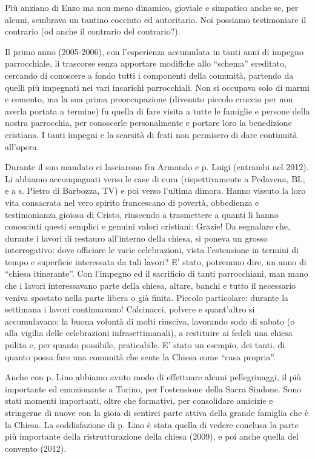 Più anziano di Enzo ma non meno dinamico, gioviale e simpatico anche se, per alcuni, sembrava un 
tantino cocciuto ed autoritario. Noi possiamo testimoniare il contrario (od anche il contrario del 
contrario?).

Il primo anno (2005-2006), con l’esperienza accumulata in tanti anni di impegno parrocchiale, li 
trascorse senza apportare modifiche allo “schema” ereditato, cercando di conoscere a fondo tutti i 
componenti della comunità, partendo da quelli più impegnati nei vari incarichi parrocchiali.
Non si occupava solo di marmi e cemento, ma la sua prima preoccupazione (divenuto piccolo 
cruccio per non averla portata a termine) fu quella di fare visita a tutte le famiglie e persone della 
nostra parrocchia, per conoscerle personalmente e portare loro la benedizione cristiana. I tanti 
impegni e la scarsità di frati non permisero di dare continuità all’opera.

Durante il suo mandato ci lasciarono fra Armando e p. Luigi (entrambi nel 2012). Li 
abbiamo accompagnati verso le case di cura (rispettivamente a Pedavena, BL, e a s. Pietro di 
Barbozza, TV) e poi verso l’ultima dimora. Hanno vissuto la loro vita consacrata nel vero spirito 
francescano di povertà, obbedienza e testimonianza gioiosa di Cristo, riuscendo a trasmettere a 
quanti li hanno conosciuti questi semplici e genuini valori cristiani: Grazie!
Da segnalare che, durante i lavori di restauro all’interno della chiesa, si poneva un grosso 
interrogativo: dove officiare le varie celebrazioni, vista l’estensione in termini di tempo e superficie 
interessata da tali lavori? E’ stato, potremmo dire, un anno di “chiesa itinerante”. Con l’impegno ed 
il sacrificio di tanti parrocchiani, man mano che i lavori interessavano parte della chiesa, altare, 
banchi e tutto il necessario veniva spostato nella parte libera o già finita. 
Piccolo particolare: durante la settimana i lavori continuavano! Calcinacci, polvere e quant’altro si 
accumulavano; la buona volontà di molti riusciva, lavorando sodo di sabato (o alla vigilia delle 
celebrazioni infrasettimanali), a restituire ai fedeli una chiesa pulita e, per quanto possibile, 
praticabile. E’ stato un esempio, dei tanti, di quanto possa fare una comunità che sente la Chiesa 
come “casa propria”.

Anche con p. Lino abbiamo avuto modo di effettuare alcuni pellegrinaggi, il più importante 
ed emozionante a Torino, per l’ostensione della Sacra Sindone. Sono stati momenti importanti, oltre 
che formativi, per consolidare amicizie e stringerne di nuove con la gioia di sentirci parte attiva 
della grande famiglia che è la Chiesa. 
La soddisfazione di p. Lino è stata quella di vedere conclusa la parte più importante della 
ristrutturazione della chiesa (2009), e poi anche quella del convento (2012).

